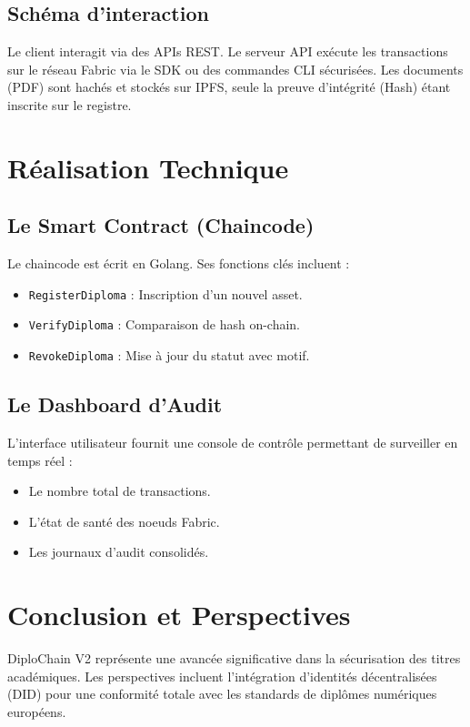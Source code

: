 \documentclass[12pt,a4paper]{report}
\begin{document}
\section{Schéma d'interaction}
Le client interagit via des APIs REST. Le serveur API exécute les transactions sur le réseau Fabric via le SDK ou des commandes CLI sécurisées. Les documents (PDF) sont hachés et stockés sur IPFS, seule la preuve d'intégrité (Hash) étant inscrite sur le registre.

\chapter{Réalisation Technique}
\section{Le Smart Contract (Chaincode)}
Le chaincode est écrit en Golang. Ses fonctions clés incluent :
\begin{itemize}
    \item \texttt{RegisterDiploma} : Inscription d'un nouvel asset.
    \item \texttt{VerifyDiploma} : Comparaison de hash on-chain.
    \item \texttt{RevokeDiploma} : Mise à jour du statut avec motif.
\end{itemize}

\section{Le Dashboard d'Audit}
L'interface utilisateur fournit une console de contrôle permettant de surveiller en temps réel :
\begin{itemize}
    \item Le nombre total de transactions.
    \item L'état de santé des noeuds Fabric.
    \item Les journaux d'audit consolidés.
\end{itemize}

\chapter{Conclusion et Perspectives}
DiploChain V2 représente une avancée significative dans la sécurisation des titres académiques. Les perspectives incluent l'intégration d'identités décentralisées (DID) pour une conformité totale avec les standards de diplômes numériques européens.



\end{document}

